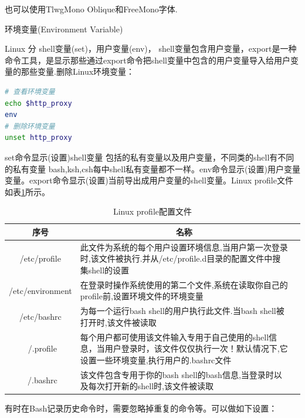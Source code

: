 \documentclass[12pt]{book}
\makeatletter
\numberwithin{dummy}{section}
\theoremstyle{ocrenumbox}
\theoremstyle{blacknumex}
\theoremstyle{blacknumbox}
\theoremstyle{ocrenum}
\renewcommand{\subsection}{\@startsection {subsection}{2}{\z@}
	{-3ex \@plus -0.1ex \@minus -.4ex}
	{0.5ex \@plus.2ex }
	{\normalfont\sffamily\bfseries}}
\makeatother
\begin{document}
也可以使用TlwgMono Oblique和FreeMono字体.

\subsection{环境变量(Environment Variable)}

Linux 分 shell变量(set)，用户变量(env)， shell变量包含用户变量，export是一种命令工具，是显示那些通过export命令把shell变量中包含的用户变量导入给用户变量的那些变量.删除Linux环境变量：

\begin{lstlisting}[language=Bash]
# 查看环境变量
echo $http_proxy
env
# 删除环境变量
unset http_proxy
\end{lstlisting}

set命令显示(设置)shell变量 包括的私有变量以及用户变量，不同类的shell有不同的私有变量 bash,ksh,csh每中shell私有变量都不一样。env命令显示(设置)用户变量变量。export命令显示(设置)当前导出成用户变量的shell变量。Linux profile文件如表\ref{table:linuxconfigfile}所示。

\begin{table}
	\caption{Linux profile配置文件}
	\label{table:linuxconfigfile}
	\begin{center}
	\begin{tabular}{cp{8cm}c}
		\hline
		\multirow{1}{*}{序号}
		& \multicolumn{1}{c}{名称}  \\
		\hline			
		/etc/profile  & 此文件为系统的每个用户设置环境信息,当用户第一次登录时,该文件被执行.并从/etc/profile.d目录的配置文件中搜集shell的设置 \\
		\hline	
		/etc/environment & 在登录时操作系统使用的第二个文件,系统在读取你自己的profile前,设置环境文件的环境变量 \\
		\hline
		/etc/bashrc & 为每一个运行bash shell的用户执行此文件.当bash shell被打开时,该文件被读取\\
		\hline
		~/.profile & 每个用户都可使用该文件输入专用于自己使用的shell信息，当用户登录时，该文件仅仅执行一次！默认情况下,它设置一些环境变量,执行用户的.bashrc文件\\
		\hline
		~/.bashrc &  该文件包含专用于你的bash shell的bash信息,当登录时以及每次打开新的shell时,该文件被读取\\
		\hline
	\end{tabular}	
	\end{center}
\end{table}

有时在Bash记录历史命令时，需要忽略掉重复的命令等。可以做如下设置：
\end{document}
